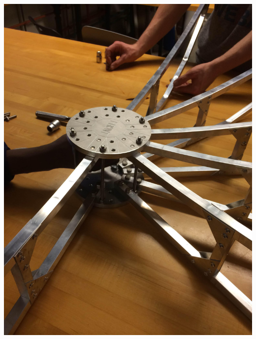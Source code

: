 \documentclass[11pt]{article} %
\begin{document}
\begin{center}
\includegraphics[scale=0.12]{dish/01.jpeg}
\end{center}
\end{document}
